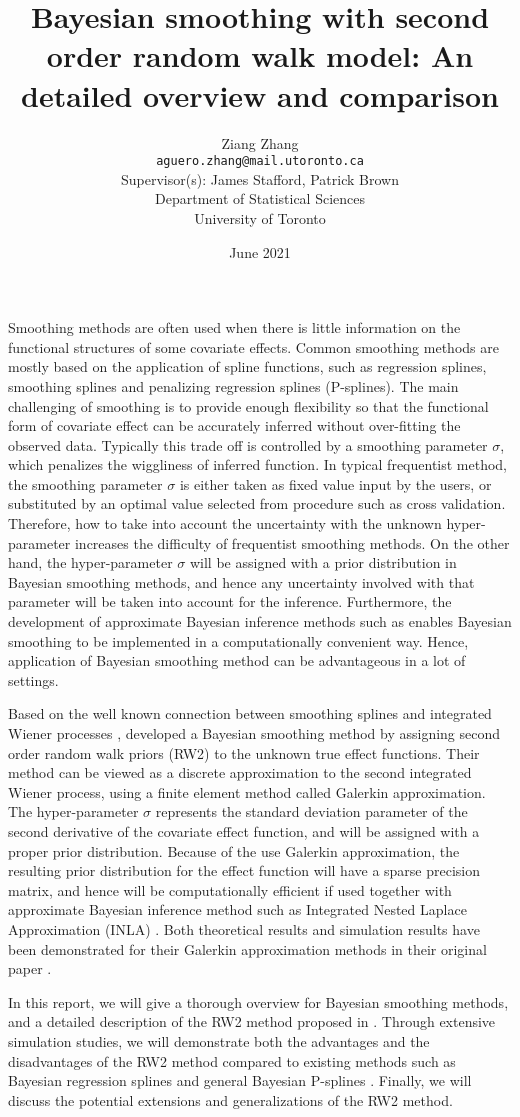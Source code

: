 \documentclass{article}
\title{\textbf{Bayesian smoothing with second order random walk model: An detailed overview and comparison}}
\author{
Ziang Zhang \\ \vspace{-0.3cm}\normalsize\texttt{aguero.zhang@mail.utoronto.ca}\\ 
\large
\vspace{0.5cm}
Supervisor(s): James Stafford, Patrick Brown \\ 

\vspace{0.5cm}
Department of Statistical Sciences \\
University of Toronto
}
\date{June 2021}
\begin{document}
\maketitle

Smoothing methods are often used when there is little information on the functional structures of some covariate effects. Common smoothing methods are mostly based on the application of spline functions, such as regression splines, smoothing splines and penalizing regression splines (P-splines). The main challenging of smoothing is to provide enough flexibility so that the functional form of covariate effect can be accurately inferred without over-fitting the observed data. Typically this trade off is controlled by a smoothing parameter $\sigma$, which penalizes the wiggliness of inferred function. In typical frequentist method, the smoothing parameter $\sigma$ is either taken as fixed value input by the users, or substituted by an optimal value selected from procedure such as cross validation. Therefore, how to take into account the uncertainty with the unknown hyper-parameter increases the difficulty of frequentist smoothing methods. On the other hand, the hyper-parameter $\sigma$ will be assigned with a prior distribution in Bayesian smoothing methods, and hence any uncertainty involved with that parameter will be taken into account for the inference. Furthermore, the development of approximate Bayesian inference methods such as \cite{inla} enables Bayesian smoothing to be implemented in a computationally convenient way. Hence, application of Bayesian smoothing method can be advantageous in a lot of settings.

Based on the well known connection between smoothing splines and integrated Wiener processes \citep{wahba}, \cite{rw2} developed a Bayesian smoothing method by assigning second order random walk priors (RW2) to the unknown true effect functions. Their method can be viewed as a discrete approximation to the second integrated Wiener process, using a finite element method called Galerkin approximation. The hyper-parameter $\sigma$ represents the standard deviation parameter of the second derivative of the covariate effect function, and will be assigned with a proper prior distribution. Because of the use Galerkin approximation, the resulting prior distribution for the effect function will have a sparse precision matrix, and hence will be computationally efficient if used together with approximate Bayesian inference method such as Integrated Nested Laplace Approximation (INLA) \citep{inla}. Both theoretical results and simulation results have been demonstrated for their Galerkin approximation methods in their original paper \citep{rw2}.

In this report, we will give a thorough overview for Bayesian smoothing methods, and a detailed description of the RW2 method proposed in \cite{rw2}. Through extensive simulation studies, we will demonstrate both the advantages and the disadvantages of the RW2 method compared to existing methods such as Bayesian regression splines and general Bayesian P-splines \citep{bayesianPsplines}. Finally, we will discuss the potential extensions and generalizations of the RW2 method.

\newpage


\end{document}
